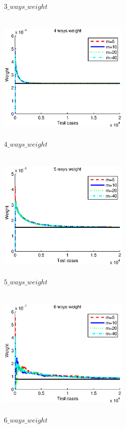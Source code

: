 \documentclass[10pt,journal,letterpaper,compsoc]{IEEEtran}
\begin{document}
\begin{CJK}{UTF8}{gkai}
\begin{figure}[htb]
   \caption{$3\_ways\_weight$}
   \label{fig:ARCH}
 \end{figure}
 \begin{figure}[htb]
   \centering
   \includegraphics[width=2.5in,height=2.5in]{./a2_1_picture/4_ways_weight.eps}
   \caption{$4\_ways\_weight$}
   \label{fig:ARCH}
 \end{figure}
 \begin{figure}[htb]
   \centering
   \includegraphics[width=2.5in,height=2.5in]{./a2_1_picture/5_ways_weight.eps}
   \caption{$5\_ways\_weight$}
   \label{fig:ARCH}
 \end{figure}
 \begin{figure}[htb]
   \centering
   \includegraphics[width=2.5in,height=2.5in]{./a2_1_picture/6_ways_weight.eps}
   \caption{$6\_ways\_weight$}
   \label{fig:ARCH}
 \end{figure}


\end{CJK}
\end{document}
